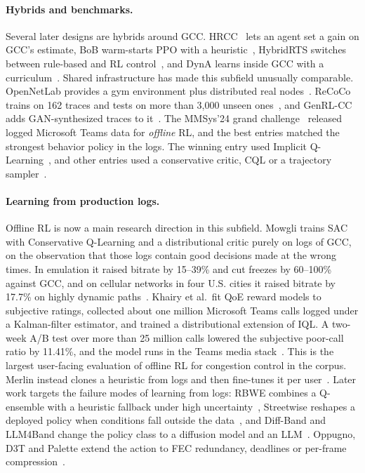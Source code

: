 \paragraph{Hybrids and benchmarks.} Several later designs are hybrids around GCC. HRCC~\cite{wang2021hybrid} lets an agent set a gain on GCC's estimate, BoB warm-starts PPO with a heuristic~\cite{bentaleb2022bob}, HybridRTS switches between rule-based and RL control~\cite{zhang2022hybridrts}, and DynA learns inside GCC with a curriculum~\cite{wu2026dyna}. Shared infrastructure has made this subfield unusually comparable. OpenNetLab provides a gym environment plus distributed real nodes~\cite{eo2022opennetlab}. ReCoCo trains on 162 traces and tests on more than 3,000 unseen ones~\cite{markudova2026advancing}, and GenRL-CC adds GAN-synthesized traces to it~\cite{islam2026genrl}. The MMSys'24 grand challenge~\cite{khairy2024acm} released logged Microsoft Teams data for \emph{offline} RL, and the best entries matched the strongest behavior policy in the logs. The winning entry used Implicit Q-Learning~\cite{tan2024accurate}, and other entries used a conservative critic, CQL or a trajectory sampler~\cite{cetinkaya2024offline,chen2024bandwidth,lu2024pioneer,zhang2024naorl}.

\paragraph{Learning from production logs.} Offline RL is now a main research direction in this subfield. Mowgli trains SAC with Conservative Q-Learning and a distributional critic purely on logs of GCC, on the observation that those logs contain good decisions made at the wrong times. In emulation it raised bitrate by 15--39\% and cut freezes by 60--100\% against GCC, and on cellular networks in four U.S. cities it raised bitrate by 17.7\% on highly dynamic paths~\cite{agarwal2025mowgli}. Khairy et al.\ fit QoE reward models to subjective ratings, collected about one million Microsoft Teams calls logged under a Kalman-filter estimator, and trained a distributional extension of IQL. A two-week A/B test over more than 25 million calls lowered the subjective poor-call ratio by 11.41\%, and the model runs in the Teams media stack~\cite{khairy2026human}. This is the largest user-facing evaluation of offline RL for congestion control in the corpus. Merlin instead clones a heuristic from logs and then fine-tunes it per user~\cite{gottipati2025offline}. Later work targets the failure modes of learning from logs: RBWE combines a Q-ensemble with a heuristic fallback under high uncertainty~\cite{kai2025robust}, Streetwise reshapes a deployed policy when conditions fall outside the data~\cite{soni2024streetwise}, and Diff-Band and LLM4Band change the policy class to a diffusion model and an LLM~\cite{lu2026diff,wang2025llm4band}. Oppugno, D3T and Palette extend the action to FEC redundancy, deadlines or per-frame compression~\cite{zhang2022joint,zhang2021deadline,li2023improving}.

